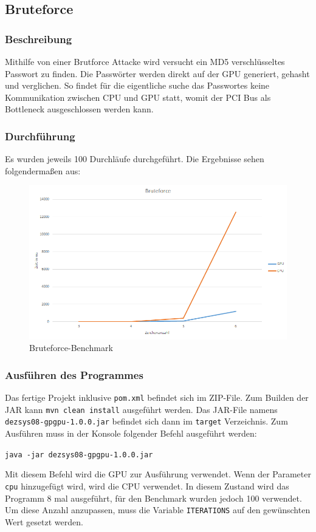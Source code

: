 \subsection{Bruteforce}
\subsubsection{Beschreibung}
Mithilfe von einer Brutforce Attacke wird versucht ein MD5 verschlüsseltes Passwort zu finden. Die Passwörter werden direkt auf der GPU generiert, gehasht und verglichen. So findet für die eigentliche suche das Passwortes keine Kommunikation zwischen CPU und GPU statt, womit der PCI Bus als Bottleneck ausgeschlossen werden kann.
\subsubsection{Durchführung}
Es wurden jeweils 100 Durchläufe durchgeführt.
Die Ergebnisse sehen folgendermaßen aus:
\begin{figure}[!h]
	\begin{center}
		\includegraphics[width=17cm]{images/bruteforce.png}
		\caption{Bruteforce-Benchmark}
	\end{center}
\end{figure}
\newpage
\subsubsection{Ausführen des Programmes}
Das fertige Projekt inklusive \texttt{pom.xml} befindet sich im ZIP-File. Zum Builden der JAR kann \texttt{mvn clean install} ausgeführt werden. Das JAR-File namens \texttt{dezsys08-gpgpu-1.0.0.jar} befindet sich dann im \texttt{target} Verzeichnis. Zum Ausführen muss in der Konsole folgender Befehl ausgeführt werden:
\begin{center}
\texttt{java -jar dezsys08-gpgpu-1.0.0.jar}
\end{center}
Mit diesem Befehl wird die GPU zur Ausführung verwendet. Wenn der Parameter \texttt{cpu} hinzugefügt wird, wird die CPU verwendet. In diesem Zustand wird das Programm 8 mal ausgeführt, für den Benchmark wurden jedoch 100 verwendet. Um diese Anzahl anzupassen, muss die Variable \texttt{ITERATIONS} auf den gewünschten Wert gesetzt werden.
\newpage
